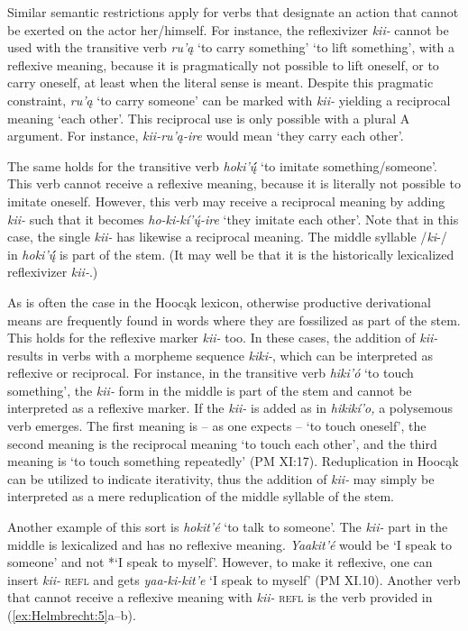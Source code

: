 \documentclass[output=paper]{langscibook}
\begin{document}
Similar semantic restrictions apply for verbs that designate an action that cannot be exerted on the actor her/himself. For instance, the reflexivizer \textit{kii-} cannot be used with the transitive verb \textit{ru'ą} `to carry something' `to lift something', with a reflexive meaning, because it is pragmatically not possible to lift oneself, or to carry oneself, at least when the literal sense is meant. Despite this pragmatic constraint, \textit{ru'ą} `to carry someone' can be marked with \textit{kii-} yielding a reciprocal meaning `each other'. This reciprocal use is only possible with a plural A argument. For instance, \textit{kii-ru'ą-ire} would mean `they carry each other'. 

The same holds for the transitive verb \textit{hoki'\'{ų́}} `to imitate something/someone'. This verb cannot receive a reflexive meaning, because it is literally not possible to imitate oneself. However, this verb may receive a reciprocal meaning by adding \textit{kii-} such that it becomes \textit{ho-ki-kí'ų́-ire} `they imitate each other'. Note that in this case, the single \textit{kii-} has likewise a reciprocal meaning. The middle syllable /\textit{ki}{}-/ in \textit{hoki'\'{ų́}} is part of the stem. (It may well be that it is the historically lexicalized reflexivizer \textit{kii-}.)

As is often the case in the Hoocąk lexicon, otherwise productive derivational means are frequently found in words where they are fossilized as part of the stem. This holds for the reflexive marker \textit{kii-} too. In these cases, the addition of \textit{kii-} results in verbs with a morpheme sequence \textit{kiki-}, which can be interpreted as reflexive or reciprocal. For instance, in the transitive verb \textit{hiki'ó} `to touch something', the \textit{kii-} form in the middle is part of the stem and cannot be interpreted as a reflexive marker. If the \textit{kii-} is added as in \textit{hikikí'o,} a polysemous verb emerges. The first meaning is – as one expects – `to touch oneself', the second meaning is the reciprocal meaning `to touch each other', and the third meaning is `to touch something repeatedly' (PM XI:17). Reduplication in Hoocąk can be utilized to indicate iterativity, thus the addition of \textit{kii-} may simply be interpreted as a mere reduplication of the middle syllable of the stem. 

Another example of this sort is \textit{hokit'é} `to talk to someone'. The \textit{kii-} part in the middle is lexicalized and has no reflexive meaning. \textit{Yaakit'é} would be `I speak to someone' and not *`I speak to myself'. However, to make it reflexive, one can insert \textit{kii-} \textsc{refl} and gets \textit{yaa-ki-kit'e} `I speak to myself' (PM XI.10). Another verb that cannot receive a reflexive meaning with \textit{kii-} \textsc{refl} is the verb provided in (\ref{ex:Helmbrecht:5}a--b). 
\end{document}
